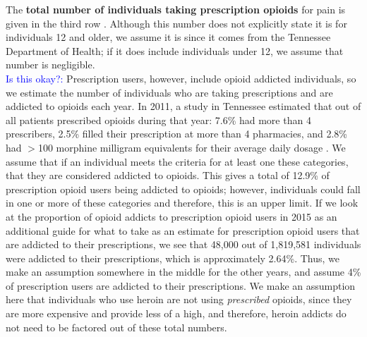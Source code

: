 \documentclass[12pt]{article}
\begin{document}
The \textbf{total number of individuals taking prescription opioids} for pain is given in the third row \cite{TNgov1}. Although this number does not explicitly state it is for individuals 12 and older, we assume it is since it comes from the Tennessee Department of Health; if it does include individuals under 12, we assume that number is negligible. \\
\textcolor{blue}{Is this okay?:} Prescription users, however, include opioid addicted individuals, so we estimate the number of individuals who are taking prescriptions and are addicted to opioids each year. In 2011, a study in Tennessee estimated that out of all patients prescribed opioids during that year: 7.6\% had more than 4 prescribers, 2.5\% filled their prescription at more than 4 pharmacies, and 2.8\% had $>$100 morphine milligram equivalents for their average daily dosage  \cite{Gwira}. We assume that if an individual meets the criteria for at least one these categories, that they are considered addicted to opioids. This gives a total of 12.9\% of prescription opioid users being addicted to opioids; however, individuals could fall in one or more of these categories and therefore, this is an upper limit. If we look at the proportion of opioid addicts to prescription opioid users in 2015 as an additional guide for what to take as an estimate for prescription opioid users that are addicted to their prescriptions, we see that 48,000 out of 1,819,581 individuals were addicted to their prescriptions, which is approximately 2.64\%. Thus, we make an assumption somewhere in the middle for the other years, and assume 4\% of prescription users are addicted to their prescriptions.  We make an assumption here that individuals who use heroin are not using \textit{prescribed} opioids, since they are more expensive and provide less of a high, and therefore, heroin addicts do not need to be factored out of these total numbers. 
\end{document}
